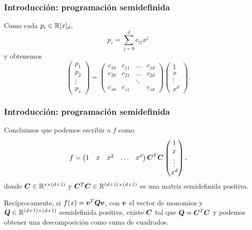 \documentclass[aspectratio=169,12pt,spanish]{beamer}
\begin{document}

\begin{frame}
\frametitle{Introducción: programación semidefinida}

Como cada $p_i \in \mathbb{R}[x]_d$,
$$p_i = \sum_{j=0}^d c_{ij} x^j$$
y obtenemos
$$
\begin{pmatrix}
p_1 \\ p_2 \\ \vdots \\ p_s
\end{pmatrix} =
\begin{pmatrix} c_{10} & c_{11} & \dots & c_{1d} \\
c_{20} & c_{21} & \dots & c_{2d} \\
& & \ddots & \\ c_{s0} & c_{s1} & & c_{sd} \end{pmatrix}
\begin{pmatrix}
1 \\ x \\ \vdots \\ x^d
\end{pmatrix}.
$$

\end{frame}


\begin{frame}
\frametitle{Introducción: programación semidefinida}

Concluimos que podemos escribir a $f$ como
$$
f = \begin{pmatrix}
1 & x & x^2 & \dots & x^d
\end{pmatrix}
\bm{C}^T \bm{C}
\begin{pmatrix}
1 \\ x \\ \vdots \\ x^d
\end{pmatrix},
$$
donde $\bm{C} \in \mathbb{R}^{s \times (d+1)}$ y $\bm{C}^T \bm{C} \in \mathbb{R}^{(d+1) \times (d+1)}$ es una matriz semidefinida positiva.

Recíprocamente, si $f(x) = \bm{v}^T \bm{Q} \bm{v}$, con $\bm{v}$ el vector de monomios y $\bm{Q} \in \mathbb{R}^{(d+1) \times (d+1)}$ semidefinida positiva, existe $\bm{C}$ tal que $\bm{Q} = \bm{C}^T \bm{C}$ y podemos obtener una descomposición como suma de cuadrados.

\end{frame}

\end{document}
